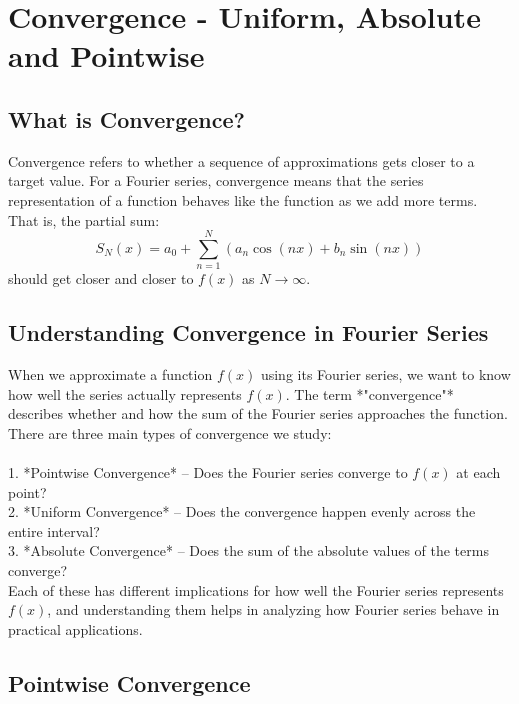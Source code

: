 
\chapter{Convergence - Uniform, Absolute and Pointwise}

\label{Chapter4}



\section{What is Convergence?}
Convergence refers to whether a sequence of approximations gets closer to a target value. For a Fourier series, convergence means that the series representation of a function behaves like the function as we add more terms. That is, the partial sum:
\begin{equation}
S_N(x) = a_0 + \sum_{n=1}^{N} (a_n \cos(nx) + b_n \sin(nx))
\end{equation}
should get closer and closer to $f(x)$ as $N \to \infty$.


\section{Understanding Convergence in Fourier Series}

When we approximate a function $f(x)$ using its Fourier series, we want to know how well the series actually represents $f(x)$. The term *"convergence"* describes whether and how the sum of the Fourier series approaches the function. There are three main types of convergence we study:\\\\
1. *Pointwise Convergence* – Does the Fourier series converge to $f(x)$ at each point?\\
2. *Uniform Convergence* – Does the convergence happen evenly across the entire interval?\\
3. *Absolute Convergence* – Does the sum of the absolute values of the terms converge?\\

Each of these has different implications for how well the Fourier series represents $f(x)$, and understanding them helps in analyzing how Fourier series behave in practical applications.

\section{Pointwise Convergence}
